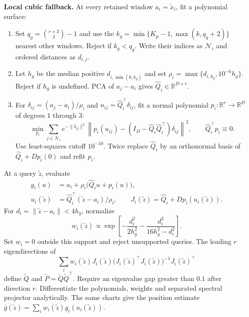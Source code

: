 \documentclass[11pt,a4paper]{article}
\newcommand{\R}{\mathbb R}
\begin{document}
\textbf{Local cubic fallback.}
At every retained window $a_i=\widetilde x_i$, fit a polynomial surface:
\begin{enumerate}
\setlength{\itemsep}{1pt}
\item Set $q_g=\binom{r+3}{3}-1$ and use the
$k_g=\min\{K_{\mathrm p}-1,\max(k,q_g+2)\}$ nearest other windows.
Reject if $k_g<q_g$. Write their indices as $\mathcal N_i$ and ordered
distances as $d_{i,j}$.
\item Let $h_g$ be the median positive $d_{i,\min(8,k_g)}$ and set
$\rho_i=\max\{d_{i,k_g},10^{-6}h_g\}$. Reject if $h_g$ is undefined.
PCA of $a_j-a_i$ gives $\widehat Q_i\in\R^{D\times r}$.
\item For $\delta_{ij}=(a_j-a_i)/\rho_i$ and
$u_{ij}=\widehat Q_i^\top\delta_{ij}$, fit a normal polynomial
$p_i:\R^r\to\R^D$ of degrees $1$ through $3$:
\[
\min_{p_i}\sum_{j\in\mathcal N_i}e^{-\|\delta_{ij}\|^2}
\left\|p_i(u_{ij})-
(I_D-\widehat Q_i\widehat Q_i^\top)\delta_{ij}\right\|^2,
\qquad \widehat Q_i^\top p_i\equiv0.
\]
Use least-squares cutoff $10^{-10}$. Twice replace $\widehat Q_i$ by
an orthonormal basis of $\widehat Q_i+Dp_i(0)$ and refit $p_i$.
\end{enumerate}
At a query $\widetilde z$, evaluate
\[
\begin{aligned}
g_i(u)&=a_i+\rho_i\bigl(\widehat Q_i u+p_i(u)\bigr),\\
u_i(\widetilde z)&=\widehat Q_i^\top(\widetilde z-a_i)/\rho_i,
\qquad J_i(\widetilde z)=\widehat Q_i+Dp_i(u_i(\widetilde z)).
\end{aligned}
\]
For $d_i=\|\widetilde z-a_i\|<4h_g$, normalize
\[
w_i(\widetilde z)\propto
\exp\!\left[-\frac{d_i^2}{2h_g^2}
-\frac{d_i^2}{16h_g^2-d_i^2}\right].
\]
Set $w_i=0$ outside this support and reject unsupported queries.
The leading $r$ eigendirections of
\[
\sum_i w_i(\widetilde z)J_i(\widetilde z)
\bigl(J_i(\widetilde z)^\top J_i(\widetilde z)\bigr)^{-1}
J_i(\widetilde z)^\top
\]
define $\widetilde Q$ and $\widetilde P=\widetilde Q\widetilde Q^\top$.
Require an eigenvalue gap greater than $0.1$ after direction $r$.
Differentiate the polynomials, weights and separated spectral projector
analytically. The same charts give the position estimate
$\bar g(\widetilde z)=\sum_iw_i(\widetilde z)g_i(u_i(\widetilde z))$.
\end{document}
